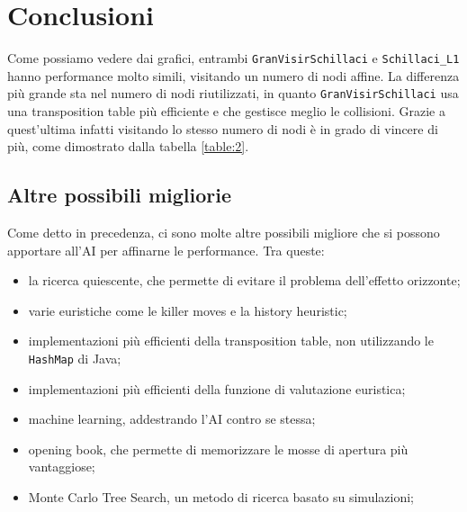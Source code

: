 \chapter{Conclusioni}

Come possiamo vedere dai grafici, entrambi \verb!GranVisirSchillaci! e \verb!Schillaci_L1! hanno performance molto simili, visitando un numero di nodi affine.
La differenza più grande sta nel numero di nodi riutilizzati, in quanto \verb!GranVisirSchillaci! usa una transposition table più efficiente e che gestisce meglio le collisioni.
Grazie a quest'ultima infatti visitando lo stesso numero di nodi è in grado di vincere di più, come dimostrato dalla tabella \ref{table:2}.

\section {Altre possibili migliorie}

Come detto in precedenza, ci sono molte altre possibili migliore che si possono apportare all'AI per affinarne le performance.
Tra queste:
\begin{itemize}
    \item la ricerca quiescente, che permette di evitare il problema dell'effetto orizzonte;
    \item varie euristiche come le killer moves e la history heuristic;
    \item implementazioni più efficienti della transposition table, non utilizzando le \verb!HashMap! di Java;
    \item implementazioni più efficienti della funzione di valutazione euristica;
    \item machine learning, addestrando l'AI contro se stessa;
    \item opening book, che permette di memorizzare le mosse di apertura più vantaggiose;
    \item Monte Carlo Tree Search, un metodo di ricerca basato su simulazioni;
\end{itemize}

